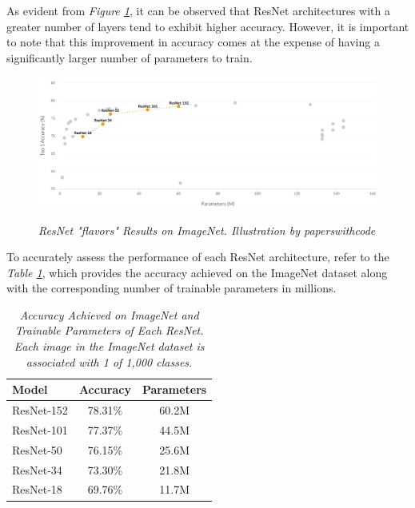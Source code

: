 \newpage

As evident from \textit{Figure \ref{fig:resnet}}, it can be observed that ResNet architectures with a greater number of layers tend to exhibit higher accuracy. However, it is important to note that this improvement in accuracy comes at the expense of having a significantly larger number of parameters to train.


\begin{figure}[H]
\begin{adjustbox}{width=\textwidth, trim={0pt 0pt 1cm 0pt}, clip}
\centering
\includegraphics[width=\textwidth]{imatges/preliminaries/ResNetImageNet.png}
\end{adjustbox}
\caption[ResNet "flavors" Results on ImageNet]{\textit{ResNet "flavors" Results on ImageNet. Illustration by paperswithcode}}
{\label{fig:resnet}}
\end{figure}

To accurately assess the performance of each ResNet architecture, refer to the \textit{Table \ref{table:resnet}}, which provides the accuracy achieved on the ImageNet dataset along with the corresponding number of trainable parameters in millions.

\begin{table}[H]
\centering
\begin{tabular}{lcc}
\toprule
\textbf{Model} & \textbf{Accuracy} & \textbf{Parameters} \\
 \midrule
ResNet-152 & 78.31\% & 60.2M \\
ResNet-101 & 77.37\% & 44.5M \\
ResNet-50 & 76.15\% & 25.6M \\
ResNet-34 & 73.30\% & 21.8M \\
ResNet-18 & 69.76\% & 11.7M \\ \bottomrule
\end{tabular}
\caption[Accuracy Achieved on ImageNet and Trainable Parameters of Each ResNet.]{\textit{Accuracy Achieved on ImageNet and Trainable Parameters of Each ResNet. Each image in the ImageNet dataset is associated with 1 of 1,000 classes.}}
{\label{table:resnet}}
\end{table}

